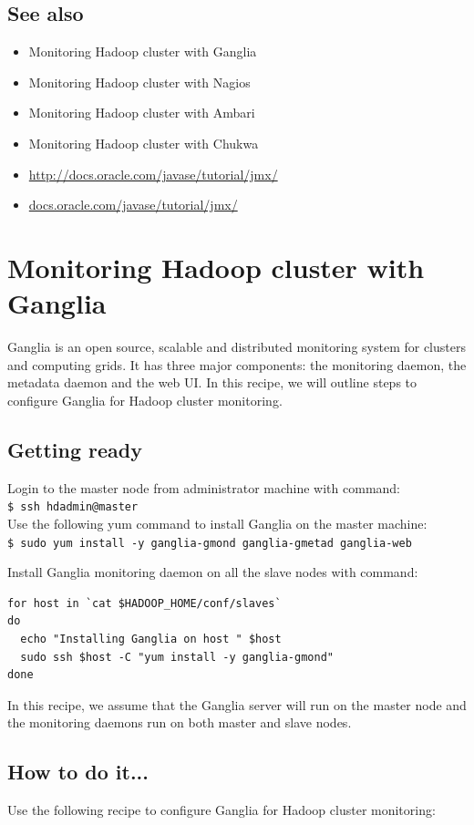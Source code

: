 \subsection*{See also}
\begin{itemize}
  \item Monitoring Hadoop cluster with Ganglia
  \item Monitoring Hadoop cluster with Nagios
  \item Monitoring Hadoop cluster with Ambari
  \item Monitoring Hadoop cluster with Chukwa
  \item \url{http://docs.oracle.com/javase/tutorial/jmx/}
  \item \url{docs.oracle.com/javase/tutorial/jmx/}
\end{itemize}

\section{Monitoring Hadoop cluster with Ganglia}
Ganglia is an open source, scalable and distributed monitoring system for clusters and computing grids. It has three major components: the monitoring daemon, the metadata daemon and the web UI. In this recipe, we will outline steps to configure Ganglia for Hadoop cluster monitoring.
\subsection*{Getting ready}
Login to the master node from administrator machine with command: \\
\verb|$ ssh hdadmin@master| \\

Use the following yum command to install Ganglia on the master machine: \\
\verb|$ sudo yum install -y ganglia-gmond ganglia-gmetad ganglia-web|

Install Ganglia monitoring daemon on all the slave nodes with command:
\begin{verbatim}
for host in `cat $HADOOP_HOME/conf/slaves`
do
  echo "Installing Ganglia on host " $host
  sudo ssh $host -C "yum install -y ganglia-gmond"
done
\end{verbatim}

In this recipe, we assume that the Ganglia server will run on the master node and the monitoring daemons run on both master and slave nodes.
\subsection*{How to do it...}
 Use the following recipe to configure Ganglia for Hadoop cluster monitoring:

